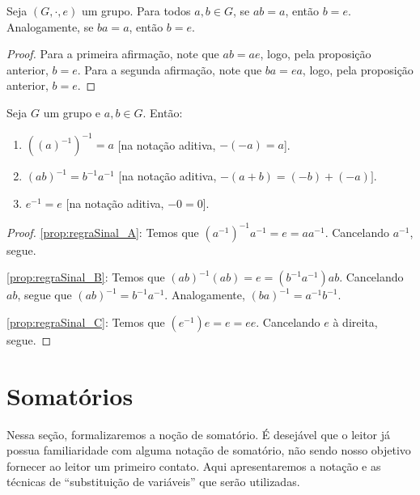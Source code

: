 \begin{corol}[Cancelamento II]\label{prop:group_cancelII}
    Seja $(G,\cdot,e)$ um grupo.
    Para todos $a, b \in G$, se $ab=a$, então $b=e$.
Analogamente, se $ba=a$, então $b=e$.
\end{corol}
\begin{proof}
    Para a primeira afirmação, note que $ab=ae$, logo, pela proposição anterior, $b=e$.
    Para a segunda afirmação, note que $ba=ea$, logo, pela proposição anterior, $b=e$.
\end{proof}

\begin{prop}\label{prop:regraSinal}
    Seja $G$ um grupo e $a, b \in G$.
    Então:
    \begin{enumerate}[label=\alph*)]
        \item $((a)^{-1})^{-1}=a$ [na notação aditiva, $-(-a)=a$].
\label{prop:regraSinal_A}
        \item $(ab)^{-1}=b^{-1}a^{-1}$ [na notação aditiva, $-(a+b)=(-b)+(-a)]$.\label{prop:regraSinal_B}
        \item $e^{-1}=e$ [na notação aditiva, $-0=0$].\label{prop:regraSinal_C}
    \end{enumerate}
\end{prop}
\begin{proof}
    \ref{prop:regraSinal_A}: Temos que $(a^{-1})^{-1}a^{-1}=e=aa^{-1}$.
    Cancelando $a^{-1}$, segue.
    
    \ref{prop:regraSinal_B}: Temos que $(ab)^{-1}(ab)=e=(b^{-1}a^{-1})ab$.
    Cancelando $ab$, segue que $(ab)^{-1}=b^{-1}a^{-1}$.
    Analogamente, $(ba)^{-1}=a^{-1}b^{-1}$.

    \ref{prop:regraSinal_C}: Temos que $(e^{-1})e=e=ee$.
    Cancelando $e$ à direita, segue.


\end{proof}

\section{Somatórios}

Nessa seção, formalizaremos a noção de somatório.
É desejável que o leitor já possua familiaridade com alguma notação de somatório, não sendo nosso objetivo fornecer ao leitor um primeiro contato. Aqui apresentaremos a notação e as técnicas de ``substituição de variáveis'' que serão utilizadas.

